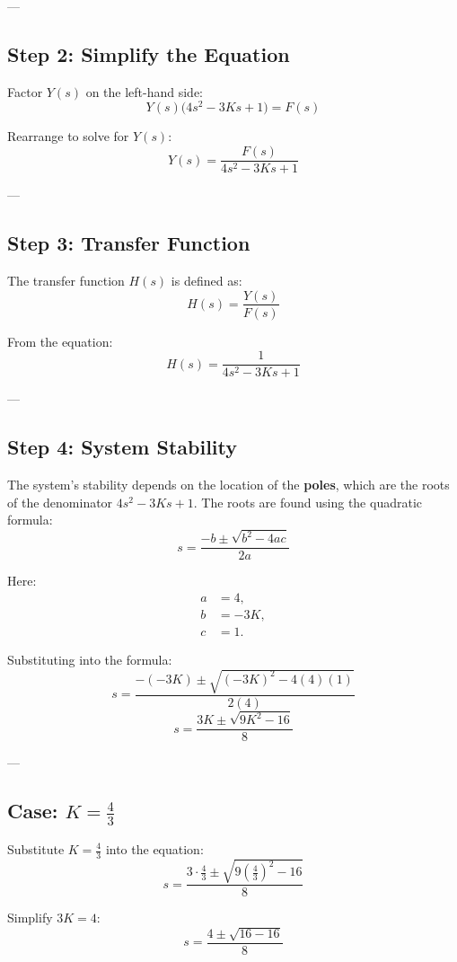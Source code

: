 \documentclass[12pt]{article}
\begin{document}
---

\subsection*{Step 2: Simplify the Equation}

Factor \( Y(s) \) on the left-hand side:
\[
Y(s) \big( 4 s^2 - 3K s + 1 \big) = F(s)
\]

Rearrange to solve for \( Y(s) \):
\[
Y(s) = \frac{F(s)}{4 s^2 - 3K s + 1}
\]

---

\subsection*{Step 3: Transfer Function}

The transfer function \( H(s) \) is defined as:
\[
H(s) = \frac{Y(s)}{F(s)}
\]

From the equation:
\[
H(s) = \frac{1}{4 s^2 - 3K s + 1}
\]

---

\subsection*{Step 4: System Stability}

The system's stability depends on the location of the \textbf{poles}, which are the roots of the denominator \( 4 s^2 - 3K s + 1 \). The roots are found using the quadratic formula:
\[
s = \frac{-b \pm \sqrt{b^2 - 4ac}}{2a}
\]

Here:
\begin{align*}
    a &= 4, \\
    b &= -3K, \\
    c &= 1.
\end{align*}

Substituting into the formula:
\[
s = \frac{-(-3K) \pm \sqrt{(-3K)^2 - 4(4)(1)}}{2(4)}
\]
\[
s = \frac{3K \pm \sqrt{9K^2 - 16}}{8}
\]

---

\subsection*{Case: \( K = \frac{4}{3} \)}

Substitute \( K = \frac{4}{3} \) into the equation:
\[
s = \frac{3 \cdot \frac{4}{3} \pm \sqrt{9 \left(\frac{4}{3}\right)^2 - 16}}{8}
\]

Simplify \( 3K = 4 \):
\[
s = \frac{4 \pm \sqrt{16 - 16}}{8}
\]
\end{document}
